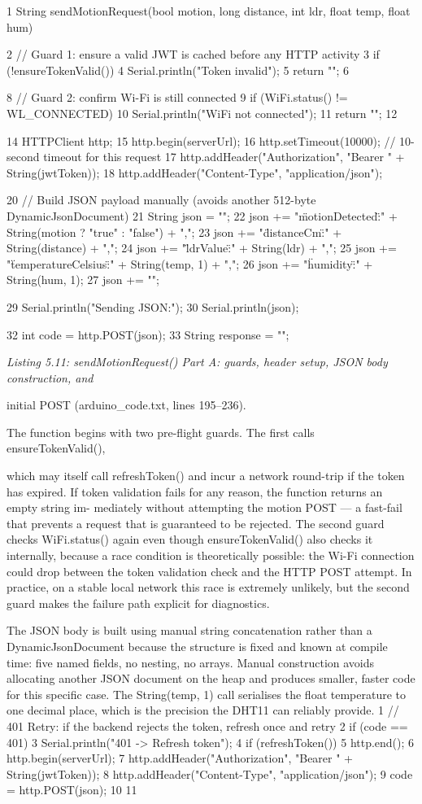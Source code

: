 1 String sendMotionRequest(bool motion, long distance, int ldr, float temp, float
hum) {
2 // Guard 1: ensure a valid JWT is cached before any HTTP activity
3 if (!ensureTokenValid()) {
4 Serial.println("Token invalid");
5 return "";
6 }


8 // Guard 2: confirm Wi-Fi is still connected
9 if (WiFi.status() != WL\_CONNECTED) {
10 Serial.println("WiFi not connected");
11 return "";
12 }

14 HTTPClient http;
15 http.begin(serverUrl);
16 http.setTimeout(10000); // 10-second timeout for this request
17 http.addHeader("Authorization", "Bearer " + String(jwtToken));
18 http.addHeader("Content-Type", "application/json");

20 // Build JSON payload manually (avoids another 512-byte DynamicJsonDocument)
21 String json = "{";
22 json += "\"motionDetected\":" + String(motion ? "true" : "false") + ",";
23 json += "\"distanceCm\":" + String(distance) + ",";
24 json += "\"ldrValue\":" + String(ldr) + ",";
25 json += "\"temperatureCelsius\":" + String(temp, 1) + ",";
26 json += "\"humidity\":" + String(hum, 1);
27 json += "}";

29 Serial.println("Sending JSON:");
30 Serial.println(json);

32 int code = http.POST(json);
33 String response = "";


\textit{Listing 5.11: sendMotionRequest() Part A: guards, header setup, JSON body construction, and}

initial POST (arduino\_code.txt, lines 195--236).


The function begins with two pre-ﬂight guards. The ﬁrst calls ensureTokenValid(),



which may itself call refreshToken() and incur a network round-trip if the token has
expired. If token validation fails for any reason, the function returns an empty string im-
mediately without attempting the motion POST --- a fast-fail that prevents a request that
is guaranteed to be rejected. The second guard checks WiFi.status() again even though
ensureTokenValid() also checks it internally, because a race condition is theoretically
possible: the Wi-Fi connection could drop between the token validation check and the
HTTP POST attempt. In practice, on a stable local network this race is extremely unlikely,
but the second guard makes the failure path explicit for diagnostics.

The JSON body is built using manual string concatenation rather than a DynamicJsonDocument
because the structure is ﬁxed and known at compile time: ﬁve named ﬁelds, no nesting, no
arrays. Manual construction avoids allocating another JSON document on the heap and
produces smaller, faster code for this speciﬁc case. The String(temp, 1) call serialises
the ﬂoat temperature to one decimal place, which is the precision the DHT11 can reliably
provide.
1 // 401 Retry: if the backend rejects the token, refresh once and retry
2 if (code == 401) {
3 Serial.println("401 -> Refresh token");
4 if (refreshToken()) {
5 http.end();
6 http.begin(serverUrl);
7 http.addHeader("Authorization", "Bearer " + String(jwtToken));
8 http.addHeader("Content-Type", "application/json");
9 code = http.POST(json);
10 }
11 }

}
